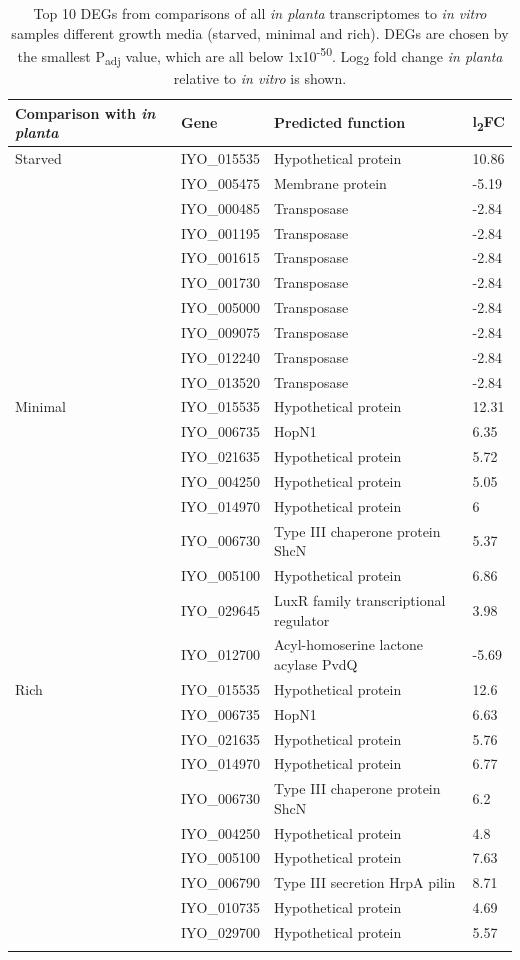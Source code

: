 {\footnotesize
\begin{longtable}{p{2cm}p{2cm}p{9cm}p{1cm}}
    \toprule
    \centering
Comparison with \textit{in planta} & Gene & Predicted function & l\textsubscript{2}FC\\\midrule
\endfirsthead
Starved & IYO_015535 & Hypothetical protein & 10.86\\
&IYO_005475 & Membrane protein & -5.19 \\
&IYO_000485 & Transposase & -2.84\\
&IYO_001195 & Transposase  & -2.84\\
&IYO_001615 & Transposase & -2.84\\
&IYO_001730 & Transposase & -2.84\\
&IYO_005000 & Transposase & -2.84\\
&IYO_009075 & Transposase & -2.84\\
&IYO_012240 & Transposase & -2.84\\
&IYO_013520 & Transposase & -2.84\\
Minimal& IYO_015535 & Hypothetical protein & 12.31\\
&IYO_006735 & HopN1 & 6.35\\
&IYO_021635 & Hypothetical protein & 5.72\\
&IYO_004250 & Hypothetical protein & 5.05\\
&IYO_014970 & Hypothetical protein & 6\\
&IYO_006730 &  Type III chaperone protein ShcN & 5.37\\
&IYO_005100 & Hypothetical protein & 6.86\\
&IYO_029645 & LuxR family transcriptional regulator & 3.98\\
&IYO_012700 & Acyl-homoserine lactone acylase PvdQ & -5.69\\
Rich &IYO_015535 & Hypothetical protein & 12.6\\
&IYO_006735 & HopN1 & 6.63\\
&IYO_021635 & Hypothetical protein & 5.76\\
&IYO_014970 & Hypothetical protein & 6.77\\
&IYO_006730  & Type III chaperone protein ShcN & 6.2\\
&IYO_004250 & Hypothetical protein & 4.8\\
&IYO_005100 & Hypothetical protein & 7.63\\
&IYO_006790  & Type III secretion HrpA pilin & 8.71\\
&IYO_010735 & Hypothetical protein & 4.69\\
&IYO_029700 & Hypothetical protein & 5.57\\

\bottomrule
    \caption[Top 10 differentially expressed genes between \textit{in planta} and \textit{in vitro} transcriptomes]{Top 10 DEGs from comparisons of all \textit{in planta} transcriptomes to \textit{in vitro} samples  different growth media (starved, minimal and rich). DEGs are chosen by the smallest P\textsubscript{adj} value, which are all below 1x10\textsuperscript{-50}. Log\textsubscript{2} fold change \textit{in planta} relative to \textit{in vitro} is shown. }
    \label{tab:vitro_v_planta}
\end{longtable}}
